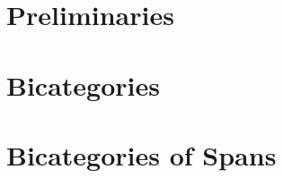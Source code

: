 \documentclass[11pt,notitlepage,a4paper]{report}
\begin{document}
{}
\chapter*{Preliminaries}



\chapter{Bicategories}














\chapter{Bicategories of Spans}





{}



\end{document}
